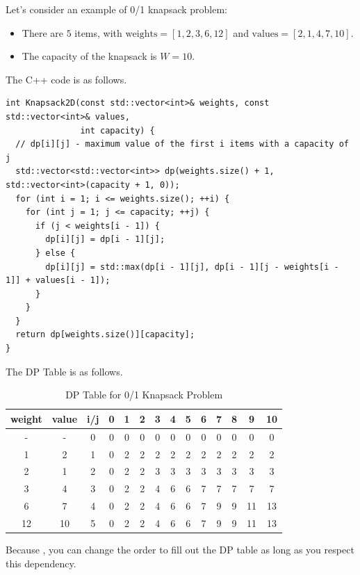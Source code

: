 Let's consider an example of 0/1 knapsack problem:
\begin{itemize}
\item There are $5$ items, with $\text{weights} = \left[1, 2, 3, 6, 12\right]$ and $\text{values} =  \left[2, 1, 4, 7, 10\right]$.
\item The capacity of the knapsack is $W = 10$.
\end{itemize}

The C++ code is as follows.
\begin{lstlisting}
int Knapsack2D(const std::vector<int>& weights, const std::vector<int>& values,
               int capacity) {
  // dp[i][j] - maximum value of the first i items with a capacity of j
  std::vector<std::vector<int>> dp(weights.size() + 1, std::vector<int>(capacity + 1, 0));
  for (int i = 1; i <= weights.size(); ++i) {
    for (int j = 1; j <= capacity; ++j) {
      if (j < weights[i - 1]) {
        dp[i][j] = dp[i - 1][j];
      } else {
        dp[i][j] = std::max(dp[i - 1][j], dp[i - 1][j - weights[i - 1]] + values[i - 1]);
      }
    }
  }
  return dp[weights.size()][capacity];
}
\end{lstlisting}

The DP Table is as follows.
\begin{table}[H]
\centering
\begin{tabular}{cc|c|c|c|c|c|c|c|c|c|c|c|c|}
\hline
weight & value & i/j & 0 & 1 & 2 & 3 & 4 & 5 & 6 & 7 & 8 & 9 & 10 \\ \hline
- & - & 0   & 0 & 0 & 0 & 0 & 0 & 0 & 0 & 0 & 0 & 0 & 0  \\ \hline
1 & 2 & 1   & 0 & 2 & 2 & 2 & 2 & 2 & 2 & 2 & 2 & 2 & 2  \\ \hline
2 & 1 & 2   & 0 & 2 & 2 & 3 & 3 & 3 & 3 & 3 & 3 & 3 & 3  \\ \hline
3 & 4 & 3   & 0 & 2 & 2 & 4 & 6 & 6 & 7 & 7 & 7 & 7 & 7  \\ \hline
6 & 7 & 4   & 0 & 2 & 2 & 4 & 6 & 6 & 7 & 9 & 9 & 11 & 13 \\ \hline
12 & 10 & 5   & 0 & 2 & 2 & 4 & 6 & 6 & 7 & 9 & 9 & 11 & 13 \\ \hline
\end{tabular}
\caption{DP Table for 0/1 Knapsack Problem}
\end{table}

Because {\color{blue}{$dp[i][j]$ depends only on the entries to its left in the previous row ($i-1$) and the entry directly above it}}, you can change the order to fill out the DP table as long as you respect this dependency.\\

